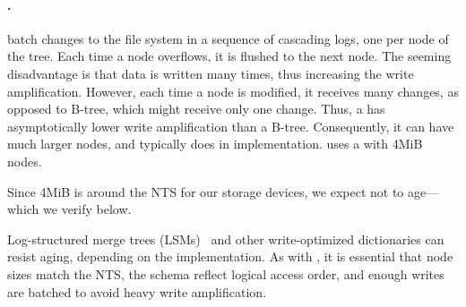 \paragraph{\bets.}  \bets batch changes to the file system in a sequence of
cascading logs, one per node of the tree.  Each time a node overflows, it is
flushed to the next node.  The seeming disadvantage is that data is written
many times, thus increasing the write amplification.  However, each time a node
is modified, it receives many changes, as opposed to B-tree, which might
receive only one change.  Thus, a \bet has asymptotically lower write
amplification than a B-tree.  Consequently, it can have much larger nodes, and
typically does in implementation.  \betrfs uses a \bet with 4MiB nodes.  

Since 4MiB is around the NTS for our storage devices, we expect \betrfs not to
age---which we verify below.

Log-structured merge trees (LSMs)~\cite{DBLP:journals/acta/ONeilCGO96} and
other write-optimized dictionaries can resist aging, depending on the
implementation.  As with \bets, it is essential that node sizes match the NTS,
the schema reflect logical access order, and enough writes are batched to avoid
heavy write amplification.  
